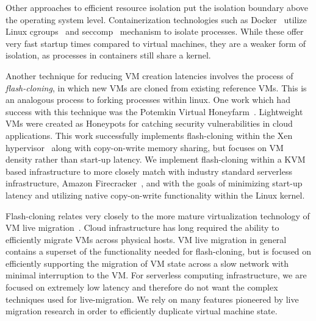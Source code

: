 Other approaches to efficient resource isolation put the isolation boundary
above the operating system level. Containerization technologies such as Docker~\cite{docker} utilize Linux cgroups~\cite{cgroups} and
seccomp~\cite{seccomp} mechanism to isolate processes. While these offer very
fast startup times compared to virtual machines, they are a weaker form of
isolation, as processes in containers still share a kernel.

Another technique for reducing VM creation latencies involves the process of
\emph{flash-cloning}, in which new VMs are cloned from existing reference VMs.
This is an analogous process to forking processes within linux. One work which
had success with this technique was the Potemkin Virtual
Honeyfarm~\cite{potemkin}. Lightweight VMs were created as Honeypots for
catching security vulnerabilities in cloud applications. This work successfully
implements flash-cloning within the Xen hypervisor~\cite{xen} along with
copy-on-write memory sharing, but focuses on VM density rather than start-up
latency. We implement flash-cloning within a KVM based infrastructure to more
closely match with industry standard serverless infrastructure, Amazon
Firecracker~\cite{firecracker}, and with the goals of minimizing start-up
latency and utilizing native copy-on-write functionality within the Linux
kernel.

 Flash-cloning relates very closely to the more
mature virtualization technology of VM live
migration~\cite{post-copy-migration}\cite{snowflock}. Cloud infrastructure has
long required the ability to efficiently migrate VMs across physical hosts. VM
live migration in general contains a superset of the functionality needed for
flash-cloning, but is focused on efficiently supporting the migration of VM
state across a slow network with minimal interruption to the VM. For serverless
computing infrastructure, we are focused on extremely low latency and therefore
do not want the complex techniques used for live-migration. We rely on many
features pioneered by live migration research in order to efficiently duplicate
virtual machine state.
